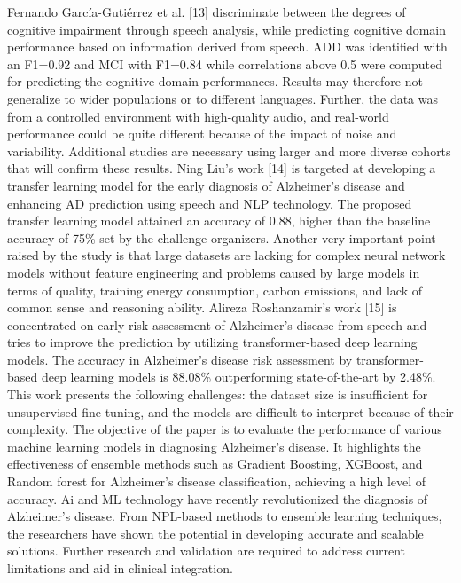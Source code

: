 \documentclass[conference]{IEEEtran} %
\begin{document}
Fernando García-Gutiérrez et al. [13] discriminate between the degrees of cognitive impairment through speech analysis, while predicting cognitive domain performance based on information derived from speech. ADD was identified with an F1=0.92 and MCI with F1=0.84 while correlations above 0.5 were computed for predicting the cognitive domain performances. Results may therefore not generalize to wider populations or to different languages. Further, the data was from a controlled environment with high-quality audio, and real-world performance could be quite different because of the impact of noise and variability. Additional studies are necessary using larger and more diverse cohorts that will confirm these results. Ning Liu's work [14] is targeted at developing a transfer learning model for the early diagnosis of Alzheimer's disease and enhancing AD prediction using speech and NLP technology. The proposed transfer learning model attained an accuracy of 0.88, higher than the baseline accuracy of 75\% set by the challenge organizers. Another very important point raised by the study is that large datasets are lacking for complex neural network models without feature engineering and problems caused by large models in terms of quality, training energy consumption, carbon emissions, and lack of common sense and reasoning ability. Alireza Roshanzamir's work [15] is concentrated on early risk assessment of Alzheimer's disease from speech and tries to improve the prediction by utilizing transformer-based deep learning models. The accuracy in Alzheimer's disease risk assessment by transformer-based deep learning models is 88.08\% outperforming state-of-the-art by 2.48\%. This work presents the following challenges: the dataset size is insufficient for unsupervised fine-tuning, and the models are difficult to interpret because of their complexity. The objective of the paper is to evaluate the performance of various machine learning models in diagnosing Alzheimer’s disease. It highlights the effectiveness of ensemble methods such as Gradient Boosting, XGBoost, and Random forest for Alzheimer's disease classification, achieving a high level of accuracy. Ai and ML technology have recently revolutionized the diagnosis of Alzheimer's disease. From NPL-based methods to ensemble learning techniques, the researchers have shown the potential in developing accurate and scalable solutions. Further research and validation are required to address current limitations and aid in clinical integration.  
\end{document}
